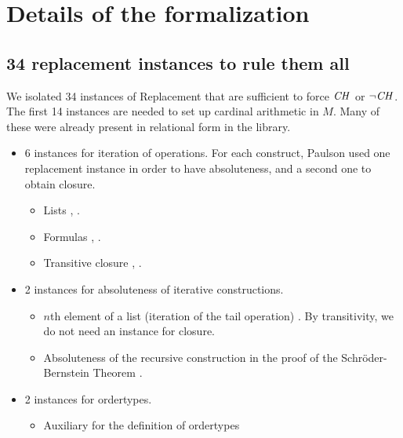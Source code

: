 \section{Details of the formalization}

\subsection{34 replacement instances to rule them all}
\label{sec:repl-instances}

We isolated 34 instances of Replacement that are sufficient to force
$\mathit{CH}$ or $\neg\mathit{CH}$. The first 14 instances are needed to set up
cardinal arithmetic in $M$. Many of these were already present in
relational form in the  library.

\begin{itemize}
\item 6 instances for iteration of operations. For each construct,
  Paulson used one replacement instance in order to have absoluteness,
  and a second one to obtain closure.
  \begin{itemize}
  \item
    Lists
    ,
    .
  \item
    Formulas
    ,
    .
  \item
    Transitive closure %
    ,
    .
  \end{itemize}
\item 2 instances for absoluteness of iterative constructions.
  \begin{itemize}
  \item
    $n$th element of a list (iteration of the tail operation)
    . By transitivity,
    we do not need an instance for closure.
  \item Absoluteness of the recursive construction in the proof of the
    Schröder-Bernstein Theorem .
  \end{itemize}
\item
  2 instances for ordertypes.
  \begin{itemize}
  \item Auxiliary for the definition of ordertypes

\end{itemize}
\end{itemize}
